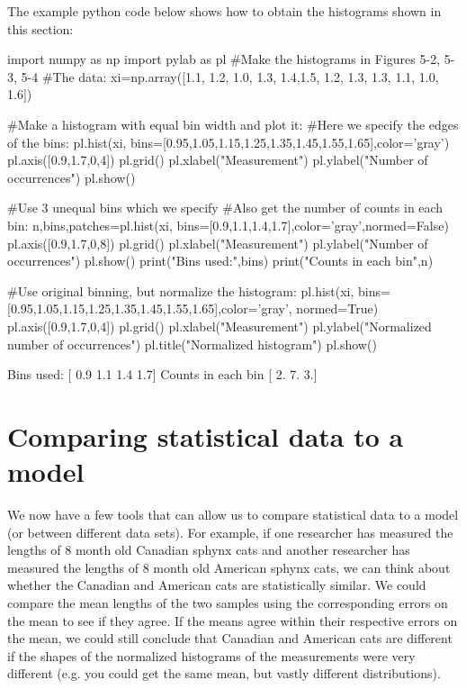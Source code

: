 The example python code below shows how to obtain the histograms shown in this section:
\begin{python}[caption = Making histograms]
import numpy as np
import pylab as pl
#Make the histograms in Figures 5-2, 5-3, 5-4
#The data:
xi=np.array([1.1, 1.2, 1.0, 1.3, 1.4,1.5, 1.2, 1.3, 1.3, 1.1, 1.0, 1.6])

#Make a histogram with equal bin width and plot it:
#Here we specify the edges of the bins:
pl.hist(xi, bins=[0.95,1.05,1.15,1.25,1.35,1.45,1.55,1.65],color='gray')
pl.axis([0.9,1.7,0,4])
pl.grid()
pl.xlabel("Measurement")
pl.ylabel("Number of occurrences")
pl.show()

#Use 3 unequal bins which we specify
#Also get the number of counts in each bin:
n,bins,patches=pl.hist(xi, bins=[0.9,1.1,1.4,1.7],color='gray',normed=False)
pl.axis([0.9,1.7,0,8])
pl.grid()
pl.xlabel("Measurement")
pl.ylabel("Number of occurrences")
pl.show()
print("Bins used:",bins)
print("Counts in each bin",n)

#Use original binning, but normalize the histogram:
pl.hist(xi, bins=[0.95,1.05,1.15,1.25,1.35,1.45,1.55,1.65],color='gray', normed=True)
pl.axis([0.9,1.7,0,4])
pl.grid()
pl.xlabel("Measurement")
pl.ylabel("Normalized number of occurrences")
pl.title("Normalized histogram")
pl.show()
\end{python}
\begin{poutput}
Bins used: [ 0.9  1.1  1.4  1.7]
Counts in each bin [ 2.  7.  3.]
\end{poutput}

\section{Comparing statistical data to a model}
We now have a few tools that can allow us to compare statistical data to a model (or between different data sets). For example, if one researcher has measured the lengths of 8 month old Canadian sphynx cats and another researcher has measured the lengths of 8 month old American sphynx cats, we can think about whether the Canadian and American cats are statistically similar. We could compare the mean lengths of the two samples using the corresponding errors on the mean to see if they agree. If the means agree within their respective errors on the mean, we could still conclude that Canadian and American cats are different if the shapes of the normalized histograms of the measurements were very different (e.g. you could get the same mean, but vastly different distributions).

